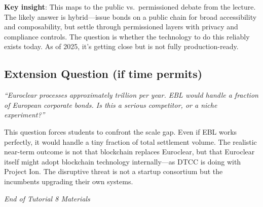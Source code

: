 \documentclass[11pt]{article}
\begin{document}
\medskip
\noindent\textbf{Key insight}: This maps to the public vs.\ permissioned debate from the lecture. The likely answer is hybrid---issue bonds on a public chain for broad accessibility and composability, but settle through permissioned layers with privacy and compliance controls. The question is whether the technology to do this reliably exists today. As of 2025, it's getting close but is not fully production-ready.

\subsection*{Extension Question (if time permits)}

\textit{``Euroclear processes approximately  trillion per year. EBL would handle a fraction of European corporate bonds. Is this a serious competitor, or a niche experiment?''}

\medskip
This question forces students to confront the scale gap. Even if EBL works perfectly, it would handle a tiny fraction of total settlement volume. The realistic near-term outcome is not that blockchain replaces Euroclear, but that Euroclear itself might adopt blockchain technology internally---as DTCC is doing with Project Ion. The disruptive threat is not a startup consortium but the incumbents upgrading their own systems.

\vfill
\begin{flushright}
\textit{End of Tutorial 8 Materials}
\end{flushright}
\end{document}
